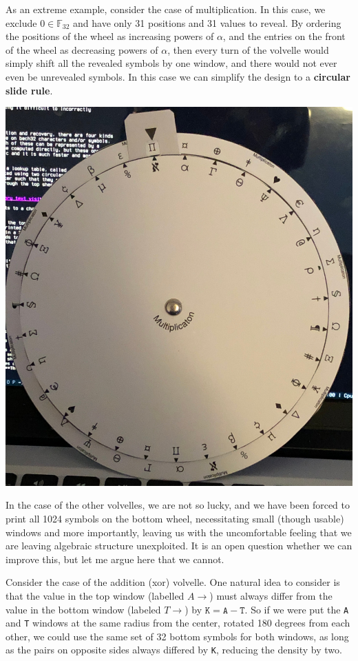 \documentclass[letterpaper]{article}
\theoremstyle{xxx}
\theoremstyle{evil}
\theoremstyle{yyy}
\theoremstyle{plain}
\theoremstyle{zzz}
\newcommand{\fttwo}{\mathbb{F}_{32}}
\begin{document}
As an extreme example, consider the case of multiplication. In this case, we
exclude $0\in\fttwo$ and have only 31 positions and 31 values to reveal. By
ordering the positions of the wheel as increasing powers of $\alpha$, and the
entries on the front of the wheel as decreasing powers of $\alpha$, then every
turn of the volvelle would simply shift all the revealed symbols by one window, and
there would not ever even be unrevealed symbols. In this case we can simplify
the design to a \textbf{circular slide rule}.

\begin{center} \includegraphics[scale=1.3]{slideruler.jpg} \end{center}

In the case of the other volvelles, we are not so lucky, and we have been forced
to print all 1024 symbols on the bottom wheel, necessitating small (though usable)
windows and more importantly, leaving us with the uncomfortable feeling that we
are leaving algebraic structure unexploited. It is an open question whether we can
improve this, but let me argue here that we cannot.

Consider the case of the addition (xor) volvelle. One natural idea to consider
is that the value in the top window (labelled $A\rightarrow$) must always differ
from the value in the bottom window (labeled $T\rightarrow$) by $\texttt{K}=\texttt{A}-\texttt{T}$. So
if we were put the \texttt{A} and \texttt{T} windows at the same radius from the center, rotated
180 degrees from each other, we could use the same set of 32 bottom symbols for
both windows, as long as the pairs on opposite sides always differed by \texttt{K},
reducing the density by two.
\end{document}
